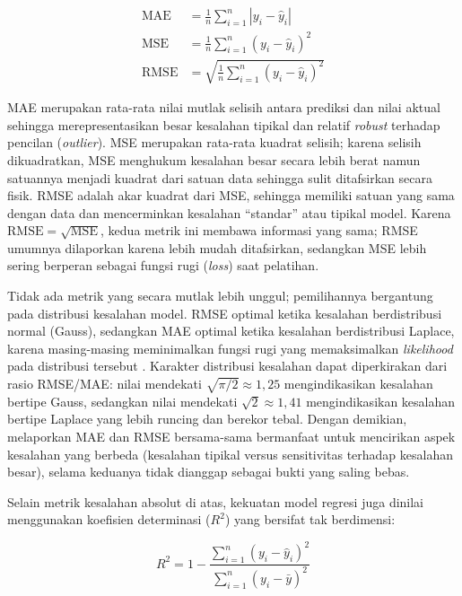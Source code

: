 \begin{align}
\text{MAE}  &= \frac{1}{n} \sum_{i=1}^{n} \left| y_i - \hat{y}_i \right| \label{eq:mae} \\
\text{MSE}  &= \frac{1}{n} \sum_{i=1}^{n} \left( y_i - \hat{y}_i \right)^2 \label{eq:mse} \\
\text{RMSE} &= \sqrt{ \frac{1}{n} \sum_{i=1}^{n} \left( y_i - \hat{y}_i \right)^2 } \label{eq:rmse}
\end{align}

  MAE merupakan rata-rata nilai mutlak selisih antara prediksi dan nilai aktual
  sehingga merepresentasikan besar kesalahan tipikal dan relatif
  \emph{robust} terhadap pencilan (\emph{outlier}). MSE merupakan rata-rata kuadrat
  selisih; karena selisih dikuadratkan, MSE menghukum kesalahan
besar secara lebih berat namun satuannya menjadi kuadrat dari satuan data
sehingga sulit ditafsirkan secara fisik. RMSE adalah akar kuadrat dari MSE,
sehingga memiliki satuan yang sama dengan data dan mencerminkan kesalahan
``standar'' atau tipikal model. Karena $\text{RMSE} = \sqrt{\text{MSE}}$, kedua
metrik ini membawa informasi yang sama; RMSE umumnya dilaporkan karena lebih
mudah ditafsirkan, sedangkan MSE lebih sering berperan sebagai fungsi rugi
(\emph{loss}) saat pelatihan.

Tidak ada metrik yang secara mutlak lebih unggul; pemilihannya bergantung pada
distribusi kesalahan model. RMSE optimal ketika kesalahan berdistribusi normal
(Gauss), sedangkan MAE optimal ketika kesalahan berdistribusi Laplace, karena
masing-masing meminimalkan fungsi rugi yang memaksimalkan \emph{likelihood} pada
distribusi tersebut \parencite{hodson2022}. Karakter distribusi kesalahan dapat
diperkirakan dari rasio RMSE/MAE: nilai mendekati $\sqrt{\pi/2}\approx 1{,}25$
mengindikasikan kesalahan bertipe Gauss, sedangkan nilai mendekati
$\sqrt{2}\approx 1{,}41$ mengindikasikan kesalahan bertipe Laplace yang lebih
runcing dan berekor tebal. Dengan demikian, melaporkan MAE dan RMSE bersama-sama
bermanfaat untuk mencirikan aspek kesalahan yang berbeda (kesalahan tipikal
versus sensitivitas terhadap kesalahan besar), selama keduanya tidak dianggap
sebagai bukti yang saling bebas.

Selain metrik kesalahan absolut di atas, kekuatan model regresi juga dinilai
menggunakan koefisien determinasi ($R^2$) yang bersifat tak berdimensi:

\begin{equation}
R^2 = 1 - \frac{\sum_{i=1}^{n} \left( y_i - \hat{y}_i \right)^2}
{\sum_{i=1}^{n} \left( y_i - \bar{y} \right)^2}
\label{eq:r2}
\end{equation}

